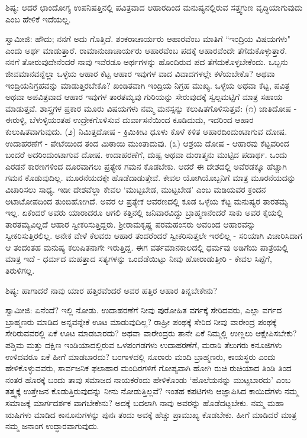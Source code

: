 ಶಿಷ್ಯ: ಆದರೆ ಛಾಂದೋಗ್ಯ ಉಪನಿಷತ್ತಿನಲ್ಲಿ ಪವಿತ್ರವಾದ ಆಹಾರದಿಂದ ಮನುಷ್ಯನಲ್ಲಿರುವ ಸತ್ತ್ವಗುಣ ವೃದ್ಧಿಯಾಗುವುದು ಎಂಬ ಹೇಳಿಕೆ ಇದೆಯಲ್ಲ.

ಸ್ವಾಮೀಜಿ: ಹೌದು; ನನಗೆ ಅದು ಗೊತ್ತಿದೆ. ಶಂಕರಾಚಾರ್ಯರು ಆಹಾರವೆಂಬ ಮಾತಿಗೆ “ಇಂದ್ರಿಯ ವಿಷಯಗಳು" ಎಂದು ಅರ್ಥ ಮಾಡುತ್ತಾರೆ. ರಾಮಾನುಜಾಚಾರ್ಯರು ಆಹಾರವೆಂಬ ಪದಕ್ಕೆ ಆಹಾರವೆಂದೇ ತೆಗೆದುಕೊಳ್ಳುತ್ತಾರೆ. ನನಗೆ ತೋರುವುದೇನೆಂದರೆ ನಾವು ಇವೆರಡೂ ಅರ್ಥಗಳನ್ನು ಹೊಂದಿರುವ ಪದ ತೆಗೆದುಕೊಳ್ಳಬೇಕೆಂದು. ಒಬ್ಬನು ಜೀವಮಾನವನ್ನೆಲ್ಲಾ ಒಳ್ಳೆಯ ಆಹಾರ ಕೆಟ್ಟ ಆಹಾರ ಇವುಗಳ ವಾದ ವಿವಾದಗಳಲ್ಲೇ ಕಳೆಯಬೇಕೊ? ಅಥವಾ ಇಂದ್ರಿಯನಿಗ್ರಹವನ್ನು ಮಾಡುತ್ತಿರಬೇಕೊ? ಖಂಡಿತವಾಗಿ ಇಂದ್ರಿಯ ನಿಗ್ರಹ ಮುಖ್ಯ. ಒಳ್ಳೆಯ ಅಥವಾ ಕೆಟ್ಟ, ಪವಿತ್ರ ಅಥವಾ ಅಪವಿತ್ರವಾದ ಆಹಾರ ಇವುಗಳ ತಾರತಮ್ಯವು ಗುರಿಯನ್ನು ಸೇರುವುದಕ್ಕೆ ಸ್ವಲ್ಪಮಟ್ಟಿಗೆ ಮಾತ್ರ ಸಹಾಯ ಮಾಡುತ್ತವೆ. ಶಾಸ್ತ್ರಗಳ ಪ್ರಕಾರ ಮೂರು ವಿಷಯಗಳು ನಮ್ಮ ಮನಸ್ಸನ್ನು ಕಲುಷಿತಗೊಳಿಸುತ್ತವೆ: (೧) ಜಾತಿದೋಷ - ಈರುಳ್ಳಿ, ಬೆಳುಳ್ಳಿಯಂತಹ ಉದ್ರೇಕಗೊಳಿಸುವ ದುರ್ವಾಸನೆಯಿಂದ ಕೂಡಿದುದು, ಇದರಿಂದ ಆಹಾರ ಕುಲುಷಿತವಾಗುವುದು. (೨) ನಿಮಿತ್ತದೋಷ - ಕ್ರಿಮಿಕೀಟ ಧೂಳು ಕೊಳೆ ಕಳಿತ ಆಹಾರದಿಂದುಂಟಾಗುವ ದೋಷ. ಉದಾಹರಣೆಗೆ - ಪೇಟೆಯಿಂದ ತಂದ ಮಿಠಾಯಿ ಮುಂತಾದುವು. (೩) ಆಶ್ರಯ ದೋಷ - ಆಹಾರವು ಕೆಟ್ಟವರಿಂದ ಬಂದರೆ ಅದರಿಂದುಂಟಾಗುವ ದೋಷ. ಉದಾಹರಣೆಗೆ, ದುಷ್ಟ ಅಥವಾ ದುರಾತ್ಮನು ಮುಟ್ಟಿದ ಪದಾರ್ಥ. ಒಂದು ಎರಡನೆ ಕಾರಣಗಳಿಂದ ದೂರವಾಗಲು ಪ್ರತ್ಯೇಕ ಗಮನ ಕೊಡಬೇಕು. ಆದರೆ ಈ ದೇಶದಲ್ಲಿ ಅವೆರಡಕ್ಕೂ ಹೆಚ್ಚಾಗಿ ಗಮನ ಕೊಡುವುದಿಲ್ಲ. ಮೂರನೆಯದಕ್ಕೇ ಹೊಡೆದಾಡುತ್ತೇವೆ. ಕೇವಲ ಯೋಗಿಯೊಬ್ಬನಿಗೆ ಮಾತ್ರ ಮೂರನೆಯದನ್ನು ವಿಚಾರಿಸಲು ಸಾಧ್ಯ. ಇಡೀ ದೇಶವೆಲ್ಲಾ ಕೇವಲ ‘ಮುಟ್ಟಬೇಡ, ಮುಟ್ಟಬೇಡ’ ಎಂಬ ಮಡಿಯವರ ಕ್ರಂದನ ಅಟಾಟೋಪದಿಂದ ತುಂಬಿಹೋಗಿದೆ. ಅವರ ಆ ಪ್ರತ್ಯೇಕ ಆವರಣದಲ್ಲಿ ಕೂಡ ಒಳ್ಳೆಯ ಕೆಟ್ಟ ಮನುಷ್ಯರ ತಾರತಮ್ಯ ಇಲ್ಲ. ಏಕೆಂದರೆ ಅವರು ಯಾರಾದರೂ ಆಗಲಿ ಕತ್ತಿನಲ್ಲಿ ಜನಿವಾರವಿದ್ದು ಬ್ರಾಹ್ಮಣನೆಂದರೆ ಸಾಕು ಅವರ ಕೈಯಲ್ಲಿ ತಾರತಮ್ಯವಿಲ್ಲದೆ ಆಹಾರ ಸ್ವೀಕರಿಸುತ್ತಿದ್ದರು. ಶ‍್ರೀರಾಮಕೃಷ್ಣ ಪರಮಹಂಸರು ಅವರಿಂದ ಆಹಾರವನ್ನು ಸ್ವೀಕರಿಸುತ್ತಿರಲಿಲ್ಲ. ಅನೇಕ ವೇಳೆ ಕೆಲವರು ಆಹಾರ ತಂದರೆಂದರೆ ಸ್ವೀಕರಿಸುತ್ತಲೇ ಇರಲಿಲ್ಲ - ಸರಿಯಾಗಿ ವಿಚಾರಿಸಿದಾಗ ಆ ತಂದಂತಹ ಮನುಷ್ಯ ಕಲುಷಿತನಾಗೇ ಇರುತ್ತಿದ್ದ. ಈಗ ವರ್ತಮಾನಕಾಲದಲ್ಲಿ ಧರ್ಮವು ಅಡಿಗೆಯ ಪಾತ್ರೆಯಲ್ಲಿ ಮಾತ್ರ ಇದೆ - ಧರ್ಮದ ಮಹತ್ತಾದ ಸತ್ಯಗಳನ್ನು ಒಂದೆಡೆಯಿಟ್ಟು ನೀವು ಹೋರಾಡುತ್ತೀರಿ - ಕೇವಲ ಸಿಪ್ಪೆಗೆ, ತಿರುಳಿಗಲ್ಲ.

ಶಿಷ್ಯ: ಹಾಗಾದರೆ ನಾವು ಯಾರ ಹತ್ತಿರವೆಂದರೆ ಅವರ ಹತ್ತಿರ ಆಹಾರ ತಿನ್ನಬೇಕೇನು?

ಸ್ವಾಮೀಜಿ: ಏನೆಂದೆ? ಇಲ್ಲಿ ನೋಡು. ಉದಾಹರಣೆಗೆ ನೀವು ಪುರೋಹಿತ ವರ್ಗಕ್ಕೆ ಸೇರಿದವರು, ಎಲ್ಲಾ ವರ್ಗದ ಬ್ರಾಹ್ಮಣರು ಮಾಡಿದ ಅನ್ನವನ್ನೇಕೆ ಊಟ ಮಾಡುವುದಿಲ್ಲ? ರಾಹ್ರೀ ಪಂಥಕ್ಕೆ ಸೇರಿದ ನೀವು ವಾರೇಂದ್ರ ಪಂಥಕ್ಕೆ ಸೇರಿರುವವರಲ್ಲಿ ಏಕೆ ಊಟ ಮಾಡಬಾರದು? ಅಥವಾ ವಾರೇಂದ್ರರು ತಾನೇ ಏಕೆ ನಿಮ್ಮಲ್ಲಿ ಉಣ್ಣಲು ಆಕ್ಷೇಪಿಸಬೇಕು? ಪಶ್ಚಿಮ ಮತ್ತು ದಕ್ಷಿಣ ಇಂಡಿಯಾದಲ್ಲಿರುವ ಒಳಪಂಗಡಗಳು ಉದಾಹರಣೆಗೆ, ಮರಾಠಿ ತೆಲುಗರು ಕನೂಜಿಗಳು ಉಳಿದವರೂ ಏಕೆ ಹೀಗೆ ಮಾಡಬಾರದು? ಬಂಗಾಳದಲ್ಲಿ ನೂರಾರು ಮಂದಿ ಬ್ರಾಹ್ಮಣರು, ಕಾಯಸ್ಥರು ಎಂದು ಹೇಳಿಕೊಳ್ಳುವವರು, ಸಾರ್ವಜನಿಕ ಫಲಾಹಾರ ಮಂದಿರಗಳಿಗೆ ಗೋಪ್ಯವಾಗಿ ಹೋಗಿ ರುಚಿ ರುಚಿಯಾದ ತಿಂಡಿ ತಿಂದ ನಂತರ ಹೊರಕ್ಕೆ ಬಂದು ತಾವು ಸಮಾಜದ ನಾಯಕರೆಂದು ಹೇಳಿಕೊಂಡು ‘ಹೊಲೆಯನನ್ನು ಮುಟ್ಟಬಾರದು’ ಎಂಬ ತತ್ತ್ವಕ್ಕೆ ಉತ್ತೇಜನ ಕೊಡುತ್ತಿರುವುದನ್ನು ನೀನು ನೋಡುತ್ತಿಲ್ಲವೆ? ಇಂತಹ ಕಪಟಿಗಳು ಆಜ್ಞಾಪಿಸಿದ ಕಾಯಿದೆಗಳು ನಮ್ಮ ಸಮಾಜಕ್ಕೆ ಮಾರ್ಗದರ್ಶಕ ವಾಗಬೇಕೇನು? ಅದಕ್ಕೆ ಬದಲಾಗಿ ನಾವು ಅವರನ್ನು ಹೊಡೆದಟ್ಟಬೇಕು. ನಮ್ಮ ಮಹಾ ಋಷಿಗಳು ಮಾಡಿದ ಕಾನೂನುಗಳನ್ನು ಪುನಃ ತಂದು ಅವಕ್ಕೆ ಹೆಚ್ಚು ಪ್ರಾಮುಖ್ಯ ಕೊಡಬೇಕು. ಹೀಗೆ ಮಾಡಿದರೆ ಮಾತ್ರ ನಮ್ಮ ಜನಾಂಗ ಉದ್ಧಾರವಾಗುವುದು.

